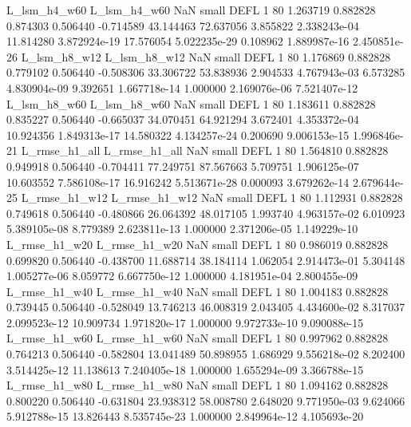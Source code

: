   L_lsm_h4_w60   L_lsm_h4_w60                   NaN      small     DEFL                 1 80 1.263719       0.882828 0.874303       0.506440   -0.714589     43.144463     72.637056     3.855822   2.338243e-04 11.814280 3.872924e-19    17.576054   5.022235e-29            0.108962    1.889987e-16        2.450851e-26
  L_lsm_h8_w12   L_lsm_h8_w12                   NaN      small     DEFL                 1 80 1.176869       0.882828 0.779102       0.506440   -0.508306     33.306722     53.838936     2.904533   4.767943e-03  6.573285 4.830904e-09     9.392651   1.667718e-14            1.000000    2.169076e-06        7.521407e-12
  L_lsm_h8_w60   L_lsm_h8_w60                   NaN      small     DEFL                 1 80 1.183611       0.882828 0.835227       0.506440   -0.665037     34.070451     64.921294     3.672401   4.353372e-04 10.924356 1.849313e-17    14.580322   4.134257e-24            0.200690    9.006153e-15        1.996846e-21
 L_rmse_h1_all  L_rmse_h1_all                   NaN      small     DEFL                 1 80 1.564810       0.882828 0.949918       0.506440   -0.704411     77.249751     87.567663     5.709751   1.906125e-07 10.603552 7.586108e-17    16.916242   5.513671e-28            0.000093    3.679262e-14        2.679644e-25
 L_rmse_h1_w12  L_rmse_h1_w12                   NaN      small     DEFL                 1 80 1.112931       0.882828 0.749618       0.506440   -0.480866     26.064392     48.017105     1.993740   4.963157e-02  6.010923 5.389105e-08     8.779389   2.623811e-13            1.000000    2.371206e-05        1.149229e-10
 L_rmse_h1_w20  L_rmse_h1_w20                   NaN      small     DEFL                 1 80 0.986019       0.882828 0.699820       0.506440   -0.438700     11.688714     38.184114     1.062054   2.914473e-01  5.304148 1.005277e-06     8.059772   6.667750e-12            1.000000    4.181951e-04        2.800455e-09
 L_rmse_h1_w40  L_rmse_h1_w40                   NaN      small     DEFL                 1 80 1.004183       0.882828 0.739445       0.506440   -0.528049     13.746213     46.008319     2.043405   4.434600e-02  8.317037 2.099523e-12    10.909734   1.971820e-17            1.000000    9.972733e-10        9.090088e-15
 L_rmse_h1_w60  L_rmse_h1_w60                   NaN      small     DEFL                 1 80 0.997962       0.882828 0.764213       0.506440   -0.582804     13.041489     50.898955     1.686929   9.556218e-02  8.202400 3.514425e-12    11.138613   7.240405e-18            1.000000    1.655294e-09        3.366788e-15
 L_rmse_h1_w80  L_rmse_h1_w80                   NaN      small     DEFL                 1 80 1.094162       0.882828 0.800220       0.506440   -0.631804     23.938312     58.008780     2.648020   9.771950e-03  9.624066 5.912788e-15    13.826443   8.535745e-23            1.000000    2.849964e-12        4.105693e-20
